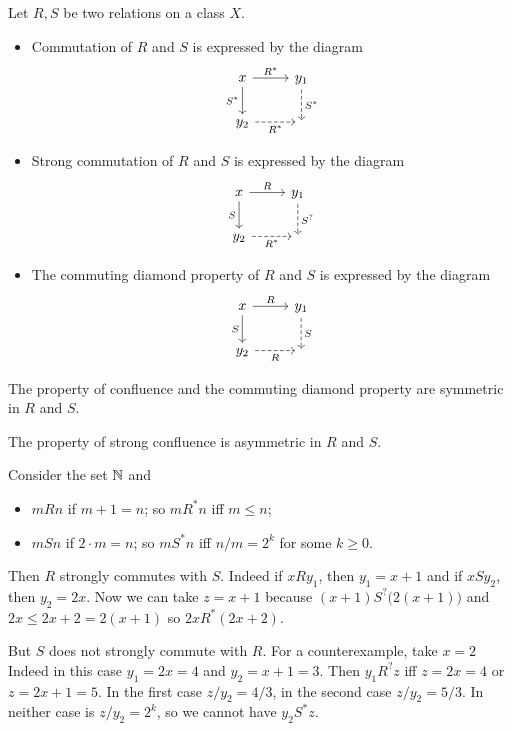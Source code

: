 \begin{example}
Let $R,S$ be two relations on a class $X$.
\begin{itemize}
\item Commutation of $R$ and $S$ is expressed by the diagram
\[ \begin{tikzcd}
x \arrow[r, "{R^*}"] \arrow[d, swap, "{S^*}"] & y_1 \arrow[d, dashed, "{S^*}"] \\
y_2 \arrow[r, dashed, swap, "{R^*}"] & {}
\end{tikzcd} \]
\item Strong commutation of $R$ and $S$ is expressed by the diagram
\[ \begin{tikzcd}
x \arrow[r, "{R}"] \arrow[d, swap, "{S}"] & y_1 \arrow[d, dashed, "{S^?}"] \\
y_2 \arrow[r, dashed, swap, "{R^*}"] & {}
\end{tikzcd} \]
\item The commuting diamond property of $R$ and $S$ is expressed by the diagram
\[ \begin{tikzcd}
x \arrow[r, "{R}"] \arrow[d, swap, "{S}"] & y_1 \arrow[d, dashed, "{S}"] \\
y_2 \arrow[r, dashed, swap, "{R}"] & {}
\end{tikzcd} \]
\end{itemize}
\end{example}

The property of confluence and the commuting diamond property are symmetric in $R$ and $S$.
\begin{example}
The property of strong confluence is asymmetric in $R$ and $S$.

Consider the set $\mathbb{N}$ and
\begin{itemize}
\item $mRn$ if $m + 1 = n$; so $mR^*n$ iff $m\leq n$;
\item $mSn$ if $2\cdot m = n$; so $mS^*n$ iff $n/m = 2^k$ for some $k\geq 0$.
\end{itemize}
Then $R$ strongly commutes with $S$. Indeed if $xRy_1$, then $y_1 = x+1$ and if $xSy_2$, then $y_2 = 2x$. Now we can take $z=x+1$ because $(x+1)S^?\big(2(x+1)\big)$ and $2x \leq 2x+2 = 2(x+1)$ so $2xR^*(2x+2)$.

But $S$ does not strongly commute with $R$. For a counterexample, take $x= 2$ Indeed in this case $y_1 = 2x = 4$ and $y_2 = x+1 = 3$. Then $y_1R^?z$ iff $z=2x= 4$ or $z=2x+1 = 5$. In the first case $z/y_2 = 4/3$, in the second case $z/y_2 = 5/3$. In neither case is $z/y_2 = 2^k$, so we cannot have $y_2S^*z$.
\end{example}

